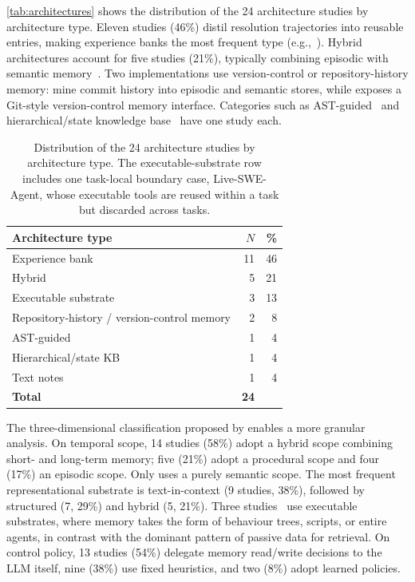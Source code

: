\autoref{tab:architectures} shows the distribution of the 24
architecture studies by architecture type.
Eleven studies (46\%) distil resolution trajectories into reusable
entries, making experience banks the most frequent type
(e.g.,~\citep{chen2025sweexp,deng2026memcoder,guo2026eet,shen2026structurally,su2025learnbyinteract}).
Hybrid architectures account for five studies (21\%), typically
combining episodic with semantic
memory~\citep{hosain2025xolver,nadafian2026kapso,wong2025confucius}.
Two implementations use version-control or repository-history memory:
\citet{wang2026improving} mine commit history into episodic and
semantic stores, while \citet{wu2025gcc} exposes a Git-style
version-control memory interface.
Categories such as AST-guided~\citep{wang2026codemem} and
hierarchical/state knowledge base~\citep{dong2026kernelblaster} have
one study each.

\begin{table}[htbp]
  \centering
  \caption{Distribution of the 24 architecture studies by architecture
    type.
    The executable-substrate row includes one task-local boundary case,
    Live-SWE-Agent, whose executable tools are reused within a task but
    discarded across tasks.}
  \label{tab:architectures}
  \begin{tabular}{l r r}
    \toprule
    Architecture type & $N$ & \% \\
    \midrule
    Experience bank       & 11 & 46 \\
    Hybrid                &  5 & 21 \\
    Executable substrate  &  3 & 13 \\
    Repository-history / version-control memory &  2 &  8 \\
    AST-guided            &  1 &  4 \\
    Hierarchical/state KB &  1 &  4 \\
    Text notes            &  1 &  4 \\
    \midrule
    \textbf{Total}      & \textbf{24} & \\
    \bottomrule
  \end{tabular}
\end{table}

The three-dimensional classification proposed by
\citet{du2026memory} enables a more granular analysis.
On temporal scope, 14 studies (58\%) adopt a hybrid scope combining
short- and long-term memory; five (21\%) adopt a procedural scope and
four (17\%) an episodic scope.
Only \citet{wang2026memgovern} uses a purely semantic scope.
The most frequent representational substrate is text-in-context (9
studies, 38\%), followed by structured (7, 29\%) and hybrid (5, 21\%).
Three
studies~\citep{li2026traversalaspolicy,xia2025livesweagent,zhang2025darwingodel}
use executable substrates, where memory takes the form of behaviour
trees, scripts, or entire agents, in contrast with the dominant pattern
of passive data for retrieval.
On control policy, 13 studies (54\%) delegate memory read/write
decisions to the LLM itself, nine (38\%) use fixed heuristics, and two
(8\%) adopt learned policies.

